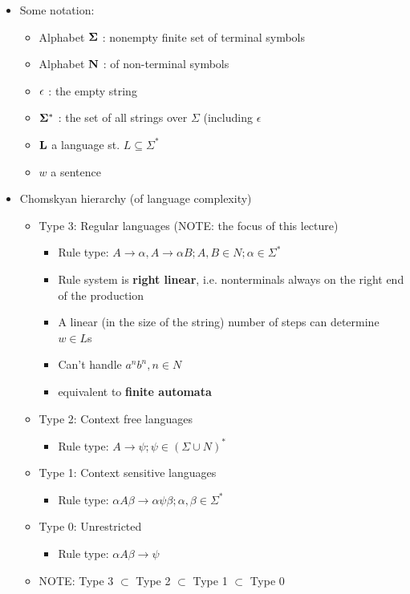\documentclass[11pt]{article}
\newenvironment{itemise}{
\begin{itemize}
  \setlength{\itemsep}{1pt}
  \setlength{\parskip}{0pt}
  \setlength{\parsep}{0pt}
}{\end{itemize}}
\begin{document}
\begin{itemise}
 \item Some notation:
  \begin{itemise}
    \item Alphabet ${\bf\Sigma}$ : nonempty finite set of terminal symbols
    \item Alphabet ${\bf N}$ : of non-terminal symbols
    \item ${\bf\epsilon}$ : the empty string
    \item ${\bf\Sigma^*}$ : the set of all strings over $\Sigma$ (including $\epsilon$
    \item ${\bf L}$ a language st. $L \subseteq \Sigma^*$
    \item $w$ a sentence
  \end{itemise}
 \item Chomskyan hierarchy (of language complexity)
  \begin{itemise}
   \item Type 3: Regular languages (NOTE: the focus of this lecture)
    \begin{itemise}
     \item Rule type: $A \rightarrow \alpha, A \rightarrow \alpha B; A,B \in N; \alpha \in \Sigma^*$
     \item Rule system is {\bf right linear}, i.e. nonterminals always on the right end of the production
     \item A linear (in the size of the string) number of steps can determine $w \in L$s
     \item Can't handle $a^n b^n , n \in N$
     \item equivalent to {\bf finite automata}
    \end{itemise}
   \item Type 2: Context free languages
    \begin{itemise}
     \item Rule type: $A \rightarrow \psi; \psi \in (\Sigma \cup N)^*$
    \end{itemise}   
   \item Type 1: Context sensitive languages
    \begin{itemise}
     \item Rule type: $\alpha A \beta \rightarrow \alpha \psi \beta; \alpha, \beta \in \Sigma^*$
    \end{itemise}
   \item Type 0: Unrestricted
    \begin{itemise}
     \item Rule type: $\alpha A \beta \rightarrow \psi$
    \end{itemise}
   \item NOTE: Type 3 $\subset$ Type 2 $\subset$ Type 1 $\subset$ Type 0
  \end{itemise}
\end{itemise}
\end{document}
